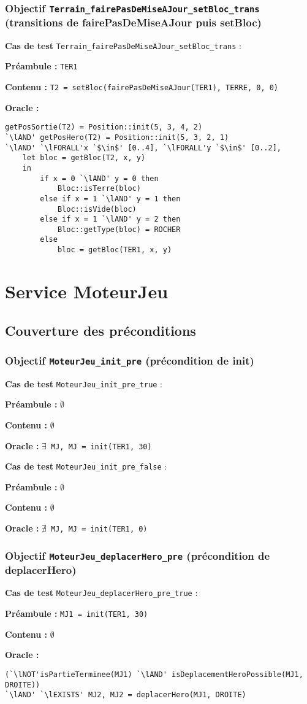 \documentclass{article}
\newcommand{\cmd}[1]{\texttt{#1}}
\newcommand{\lAND}{$\land$}
\newcommand{\lNOT}{$\lnot$}
\newcommand{\lFORALL}{$\forall$}
\newcommand{\lEXISTS}{$\exists$}
\newcommand{\lNEXISTS}{$\nexists{}$}
\newcommand{\obj}[2]{\subsubsection*{\large{\textbf{Objectif {\cmd{#1} (#2)}}}}}
\newenvironment{cas}[1]
{
	\hspace{1em}\textbf{Cas de test} \cmd{#1} :
	\begin{list}{}{}
}{
	\end{list}\vspace{1em}
}
\newcommand{\pre}[1]{\item \textbf{Préambule :} \cmd{#1}}
\newcommand{\npre}{\item \textbf{Préambule :} $\emptyset$}
\newcommand{\ope}[1]{\item \textbf{Contenu :} \cmd{#1}}
\newcommand{\nope}{\item \textbf{Contenu :} $\emptyset$}
\newcommand{\ora}[1]{\item \textbf{Oracle :} \cmd{#1}}
\newcommand{\oram}{\item \textbf{Oracle :}}
\begin{document}
\obj{Terrain\_fairePasDeMiseAJour\_setBloc\_trans} {transitions de fairePasDeMiseAJour puis setBloc}
	\begin{cas} {Terrain\_fairePasDeMiseAJour\_setBloc\_trans}
		\pre{TER1}
		\ope{T2 = setBloc(fairePasDeMiseAJour(TER1), TERRE, 0, 0)}
		\oram{}
		\begin{lstlisting}
getPosSortie(T2) = Position::init(5, 3, 4, 2)
`\lAND' getPosHero(T2) = Position::init(5, 3, 2, 1)
`\lAND' `\lFORALL'x `$\in$' [0..4], `\lFORALL'y `$\in$' [0..2],
	let bloc = getBloc(T2, x, y)
	in
		if x = 0 `\lAND' y = 0 then
			Bloc::isTerre(bloc)
		else if x = 1 `\lAND' y = 1 then
			Bloc::isVide(bloc)
		else if x = 1 `\lAND' y = 2 then
			Bloc::getType(bloc) = ROCHER
		else
			bloc = getBloc(TER1, x, y)
		\end{lstlisting}
	\end{cas}


























\section{Service MoteurJeu}


\subsection*{Couverture des préconditions}

\obj{MoteurJeu\_init\_pre} {précondition de init}
	\begin{cas} {MoteurJeu\_init\_pre\_true}
		\npre{}
		\nope{}
		\ora{\lEXISTS{} MJ, MJ = init(TER1, 30)}
	\end{cas}

	\begin{cas} {MoteurJeu\_init\_pre\_false}
		\npre{}
		\nope{}
		\ora{\lNEXISTS{} MJ, MJ = init(TER1, 0)}
	\end{cas}


\obj{MoteurJeu\_deplacerHero\_pre} {précondition de deplacerHero}
	\begin{cas} {MoteurJeu\_deplacerHero\_pre\_true}
		\pre{MJ1 = init(TER1, 30)}
		\nope{}
		\oram{}
		\begin{lstlisting}
(`\lNOT'isPartieTerminee(MJ1) `\lAND' isDeplacementHeroPossible(MJ1, DROITE))
`\lAND' `\lEXISTS' MJ2, MJ2 = deplacerHero(MJ1, DROITE)
		\end{lstlisting}
	\end{cas}
\end{document}
